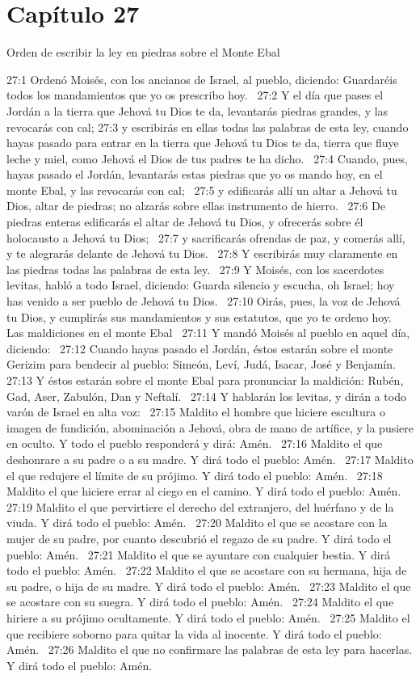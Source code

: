 \section*{Capítulo 27}

Orden de escribir la ley en piedras sobre el Monte Ebal  

27:1 Ordenó Moisés, con los ancianos de Israel, al pueblo, diciendo: Guardaréis todos los mandamientos que yo os prescribo hoy.  
27:2 Y el día que pases el Jordán a la tierra que Jehová tu Dios te da, levantarás piedras grandes, y las revocarás con cal; 
27:3 y escribirás en ellas todas las palabras de esta ley, cuando hayas pasado para entrar en la tierra que Jehová tu Dios te da, tierra que fluye leche y miel, como Jehová el Dios de tus padres te ha dicho.  
27:4 Cuando, pues, hayas pasado el Jordán, levantarás estas piedras que yo os mando hoy, en el monte Ebal, y las revocarás con cal;  
27:5 y edificarás allí un altar a Jehová tu Dios, altar de piedras; no alzarás sobre ellas instrumento de hierro.  
27:6 De piedras enteras edificarás el altar de Jehová tu Dios, y ofrecerás sobre él holocausto a Jehová tu Dios;  
27:7 y sacrificarás ofrendas de paz, y comerás allí, y te alegrarás delante de Jehová tu Dios.  
27:8 Y escribirás muy claramente en las piedras todas las palabras de esta ley.  
27:9 Y Moisés, con los sacerdotes levitas, habló a todo Israel, diciendo: Guarda silencio y escucha, oh Israel; hoy has venido a ser pueblo de Jehová tu Dios.  
27:10 Oirás, pues, la voz de Jehová tu Dios, y cumplirás sus mandamientos y sus estatutos, que yo te ordeno hoy.  
Las maldiciones en el monte Ebal  
27:11 Y mandó Moisés al pueblo en aquel día, diciendo:  
27:12 Cuando hayas pasado el Jordán, éstos estarán sobre el monte Gerizim para bendecir al pueblo: Simeón, Leví, Judá, Isacar, José y Benjamín.  
27:13 Y éstos estarán sobre el monte Ebal para pronunciar la maldición: Rubén, Gad, Aser, Zabulón, Dan y Neftalí.  
27:14 Y hablarán los levitas, y dirán a todo varón de Israel en alta voz:  
27:15 Maldito el hombre que hiciere escultura o imagen de fundición, abominación a Jehová, obra de mano de artífice, y la pusiere en oculto. Y todo el pueblo responderá y dirá: Amén.  
27:16 Maldito el que deshonrare a su padre o a su madre. Y dirá todo el pueblo: Amén.  
27:17 Maldito el que redujere el límite de su prójimo. Y dirá todo el pueblo: Amén.  
27:18 Maldito el que hiciere errar al ciego en el camino. Y dirá todo el pueblo: Amén. 
27:19 Maldito el que pervirtiere el derecho del extranjero, del huérfano y de la viuda. Y dirá todo el pueblo: Amén.  
27:20 Maldito el que se acostare con la mujer de su padre, por cuanto descubrió el regazo de su padre. Y dirá todo el pueblo: Amén.  
27:21 Maldito el que se ayuntare con cualquier bestia. Y dirá todo el pueblo: Amén.  
27:22 Maldito el que se acostare con su hermana, hija de su padre, o hija de su madre. Y dirá todo el pueblo: Amén.  
27:23 Maldito el que se acostare con su suegra. Y dirá todo el pueblo: Amén.  
27:24 Maldito el que hiriere a su prójimo ocultamente. Y dirá todo el pueblo: Amén.  
27:25 Maldito el que recibiere soborno para quitar la vida al inocente. Y dirá todo el pueblo: Amén.  
27:26 Maldito el que no confirmare las palabras de esta ley para hacerlas. Y dirá todo el pueblo: Amén.  
